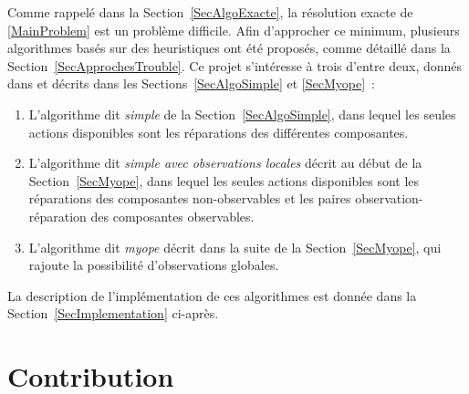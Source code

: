 \documentclass[a4paper,11pt]{article}
\theoremstyle{plain}
\theoremstyle{definition}
\begin{document}
Comme rappelé dans la Section~\ref{SecAlgoExacte}, la résolution exacte de \eqref{MainProblem} est un problème difficile. Afin d'approcher ce minimum, plusieurs algorithmes basés sur des heuristiques ont été proposés, comme détaillé dans la Section~\ref{SecApprochesTrouble}. Ce projet s'intéresse à trois d'entre deux, donnés dans \cite{Heckerman_1995, heckerman1994troubleshooting} et décrits dans les Sections~\ref{SecAlgoSimple} et \ref{SecMyope}~:
\begin{enumerate}
\item L'algorithme dit \emph{simple} de la Section~\ref{SecAlgoSimple}, dans lequel les seules actions disponibles sont les réparations des différentes composantes.

\item L'algorithme dit \emph{simple avec observations locales} décrit au début de la Section~\ref{SecMyope}, dans lequel les seules actions disponibles sont les réparations des composantes non-observables et les paires observation-réparation des composantes observables.

\item L'algorithme dit \emph{myope} décrit dans la suite de la Section~\ref{SecMyope}, qui rajoute la possibilité d'observations globales.
\end{enumerate}
La description de l'implémentation de ces algorithmes est donnée dans la Section~\ref{SecImplementation} ci-après.


\section{Contribution}
\label{SecContribution}
\end{document}
